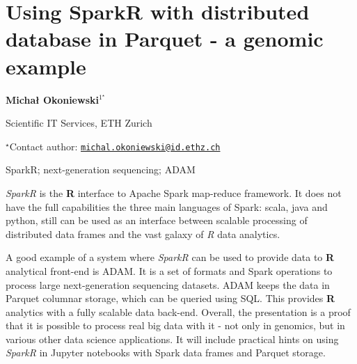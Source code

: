 \documentclass[\main/boa.tex]{subfiles}
\begin{document}
\pagestyle{empty}

\section{Using SparkR with distributed database in Parquet - a genomic example}

\begin{center}
  {\bf {} Michał Okoniewski$^{1^\star}$}
\end{center}

\vskip 0.3cm

\begin{affiliations}
\begin{enumerate}
\begin{minipage}{0.915\textwidth}
\centering
\item Scientific IT Services, ETH Zurich \\[-2pt]
\end{minipage}
\end{enumerate}
$^\star$Contact author: \href{mailto:michal.okoniewski@id.ethz.ch}{\nolinkurl{michal.okoniewski@id.ethz.ch}}\\
\end{affiliations}

\vskip 0.5cm

\begin{minipage}{0.915\textwidth}
\keywords SparkR; next-generation sequencing; ADAM
\packages {}
\end{minipage}

\vskip 0.8cm

\emph{SparkR} is the \textbf{R} interface to Apache Spark map-reduce
framework. It does not have the full capabilities the three main
languages of Spark: scala, java and python, still can be used as an
interface between scalable processing of distributed data frames and the
vast galaxy of \emph{R} data analytics.

A good example of a system where \emph{SparkR} can be used to provide
data to \textbf{R} analytical front-end is ADAM. It is a set of formats
and Spark operations to process large next-generation sequencing
datasets. ADAM keeps the data in Parquet columnar storage, which can be
queried using SQL. This provides \textbf{R} analytics with a fully
scalable data back-end. Overall, the presentation is a proof that it is
possible to process real big data with it - not only in genomics, but in
various other data science applications. It will include practical hints
on using \emph{SparkR} in Jupyter notebooks with Spark data frames and
Parquet storage.
\end{document}
